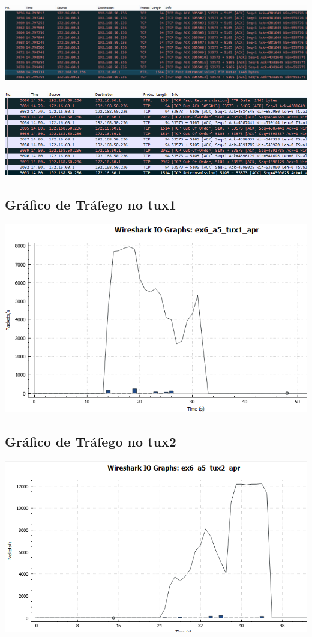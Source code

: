 \documentclass[11pt,a4paper,reqno]{report}
\numberwithin{equation}{section}
\begin{document}
\begin{appendices}
\includegraphics[width=16cm]{ex6_tux1_fastretransmission.png}

\includegraphics[width=16cm]{ex6_tux1_retransmission.png}

\subsection{Gráfico de Tráfego no tux1}
\label{ex6_a5_1io}
\includegraphics[width=16cm]{ex6_a5_tux1_IO.png}
\subsection{Gráfico de Tráfego no tux2}
\label{ex6_a5_2io}
\includegraphics[width=16cm]{ex6_a5_tux2_IO.png}


\end{appendices}
\end{document}
